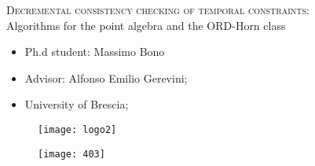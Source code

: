 \documentclass[pdf]{beamer}
\title{}
\subtitle{}
\author{Ph.d student: Massimo Bono (2nd year)\\ advisor: Alfonso Emilio Gerevini}
\institute{University of Brescia}
\date{\today}
\begin{document}
\beamertemplatenavigationsymbolsempty

\begin{frame}
\Large{\textsc{Decremental consistency checking of temporal constraints:}} \\
\large{Algorithms for the point algebra and the ORD-Horn class}

\begin{minipage}{0.6\textwidth}
	\vspace{1cm}
	\begin{itemize}
		\item Ph.d student: Massimo Bono
		\item Advisor: Alfonso Emilio Gerevini;
		\item University of Brescia;
	\end{itemize}
	\begin{figure}
		\texttt{[image: logo2]}
	\end{figure}
\end{minipage}%
\begin{minipage}{0.4\textwidth}
	\begin{figure}
		\centering
		\texttt{[image: 403]}
	\end{figure}
\end{minipage}

\end{frame}
\end{document}
